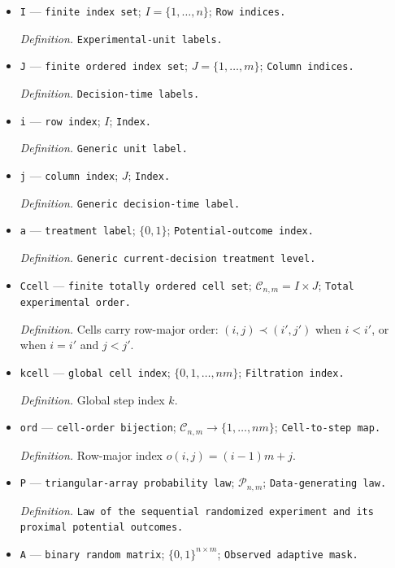 \documentclass{article}
\begin{document}
\begin{itemize}
  \item \texttt{I} --- \texttt{finite index set}; \(I=\{1,\ldots,n\}\); \texttt{Row indices.}
  \par\smallskip\noindent\emph{Definition.} \texttt{Experimental-\allowbreak{}unit labels.}
  \item \texttt{J} --- \texttt{finite ordered index set}; \(J=\{1,\ldots,m\}\); \texttt{Column indices.}
  \par\smallskip\noindent\emph{Definition.} \texttt{Decision-\allowbreak{}time labels.}
  \item \texttt{i} --- \texttt{row index}; \(I\); \texttt{Index.}
  \par\smallskip\noindent\emph{Definition.} \texttt{Generic unit label.}
  \item \texttt{j} --- \texttt{column index}; \(J\); \texttt{Index.}
  \par\smallskip\noindent\emph{Definition.} \texttt{Generic decision-\allowbreak{}time label.}
  \item \texttt{a} --- \texttt{treatment label}; \(\{0,1\}\); \texttt{Potential-\allowbreak{}outcome index.}
  \par\smallskip\noindent\emph{Definition.} \texttt{Generic current-\allowbreak{}decision treatment level.}
  \item \texttt{Ccell} --- \texttt{finite totally ordered cell set}; \(\mathcal C_{n,m}=I\times J\); \texttt{Total experimental order.}
  \par\smallskip\noindent\emph{Definition.} Cells carry row-major order: \( (i,j)\prec(i',j')\) when \(i<i'\), or when \(i=i'\) and \(j<j'\).
  \item \texttt{kcell} --- \texttt{global cell index}; \(\{0,1,\ldots,nm\}\); \texttt{Filtration index.}
  \par\smallskip\noindent\emph{Definition.} Global step index \(k\).
  \item \texttt{ord} --- \texttt{cell-\allowbreak{}order bijection}; \(\mathcal C_{n,m}\to\{1,\ldots,nm\}\); \texttt{Cell-\allowbreak{}to-\allowbreak{}step map.}
  \par\smallskip\noindent\emph{Definition.} Row-major index \(o(i,j)=(i-1)m+j\).
  \item \texttt{P} --- \texttt{triangular-\allowbreak{}array probability law}; \(\mathcal P_{n,m}\); \texttt{Data-\allowbreak{}generating law.}
  \par\smallskip\noindent\emph{Definition.} \texttt{Law of the sequential randomized experiment and its proximal potential outcomes.}
  \item \texttt{A} --- \texttt{binary random matrix}; \(\{0,1\}^{n\times m}\); \texttt{Observed adaptive mask.}

\end{itemize}
\end{document}
